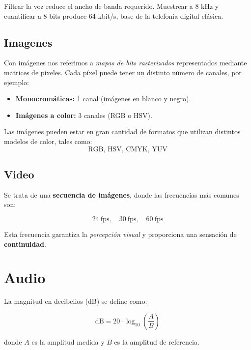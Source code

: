 \documentclass[11pt,a4paper]{article}
\begin{document}
\begin{ResumenBox}
Filtrar la voz reduce el ancho de banda requerido. Muestrear a 8 kHz y cuantificar a 8 bits produce 64 kbit/s, base de la telefonía digital clásica.
\end{ResumenBox}

\subsection{Imagenes}

Con imágenes nos referimos a \textit{mapas de bits rasterizados} representados mediante matrices de píxeles.
Cada píxel puede tener un distinto número de canales, por ejemplo:
\begin{itemize}
    \item \textbf{Monocromáticas:} 1 canal (imágenes en blanco y negro).
    \item \textbf{Imágenes a color:} 3 canales (RGB o HSV).
\end{itemize}

Las imágenes pueden estar en gran cantidad de formatos que utilizan distintos modelos de color, tales como:
\begin{equation*}
\text{RGB, HSV, CMYK, YUV}
\end{equation*}

\subsection{Video}

Se trata de una \textbf{secuencia de imágenes}, donde las frecuencias más comunes son:

\begin{equation*}
24 \ \text{fps}, \quad 30 \ \text{fps}, \quad 60 \ \text{fps}
\end{equation*}

Esta frecuencia garantiza la \textit{percepción visual} y proporciona una sensación de \textbf{continuidad}.

\section{Audio}
La magnitud en decibelios (dB) se define como:

\begin{equation*}
\text{dB} = 20 \cdot \log_{10}\!\left(\frac{A}{B}\right)
\end{equation*}

donde $A$ es la amplitud medida y $B$ es la amplitud de referencia.
\end{document}
